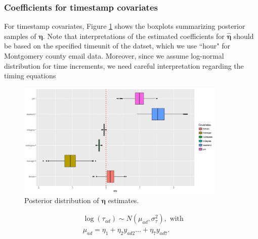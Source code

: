 \documentclass[ba]{imsart}
\numberwithin{equation}{section}
\theoremstyle{plain}
\begin{document}
		\subsubsection{Coefficients for timestamp covariates}
	For timestamp covariates, Figure \ref{figure:etaresults} shows the boxplots summarizing posterior samples of $\boldsymbol{\eta}$. Note that interpretations of the estimated coefficients for $\hat{\boldsymbol{\eta}}$ should be based on the specified timeunit of the datset, which we use ``hour" for Montgomery county email data. Moreover, since we assume log-normal distribution for time increments, we need careful interpretation regarding the timing equations
			\begin{figure}[!t]
				\centering
				\includegraphics[width=0.89\textwidth]{img/etaest-1.png}	
				\caption {Posterior distribution of $\boldsymbol{\eta}$ estimates.}
				\label{figure:etaresults}
			\end{figure}
	\begin{equation*}
	\begin{aligned}
	&\log(\tau_{ad}) \sim N(\mu_{ad}, \sigma_\tau^2), \mbox{ with }\\
	&\mu_{ad} = \eta_{1}+\eta_{2} y_{ad2}\ldots+\eta_{7}y_{ad7}.
	\end{aligned}
	\end{equation*}
\end{document}
